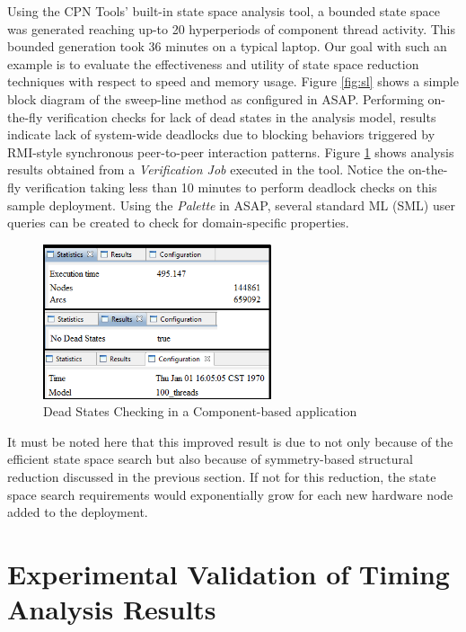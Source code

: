 Using the CPN Tools' built-in state space analysis tool, a bounded state space was generated reaching up-to 20 hyperperiods of component thread activity. This bounded generation took 36 minutes on a typical laptop. Our goal with such an example is to evaluate the effectiveness and utility of state space reduction techniques with respect to speed and memory usage. Figure \ref{fig:sl} shows a simple block diagram of the sweep-line method as configured in ASAP. Performing on-the-fly verification checks for lack of dead states in the analysis model, results indicate lack of system-wide deadlocks due to blocking behaviors triggered by RMI-style synchronous peer-to-peer interaction patterns. Figure \ref{fig:ds} shows analysis results obtained from a \emph{Verification Job} executed in the tool. Notice the on-the-fly verification taking less than 10 minutes to perform deadlock checks on this sample deployment. Using the \emph{Palette} in ASAP, several standard ML (SML) user queries can be created to check for domain-specific properties. 

\begin{figure}[h]
	\centering
	\includegraphics[width=0.6\textwidth]{./figs/asap}
	\caption{Dead States Checking in a Component-based application}
	\label{fig:ds}
\end{figure}

It must be noted here that this improved result is due to not only because of the efficient state space search but also because of symmetry-based structural reduction discussed in the previous section. If not for this reduction, the state space search requirements would exponentially grow for each new hardware node added to the deployment. 
\fi

\newpage
\section{Experimental Validation of Timing Analysis Results}
\label{sec:Experimental_Evaluation}

